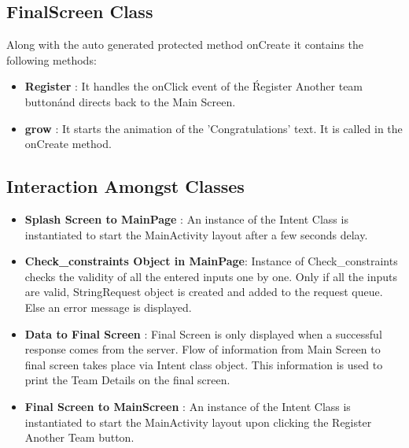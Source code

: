 \documentclass{article}
\begin{document}
\subsection{FinalScreen Class}
\par\noindent Along with the auto generated protected method onCreate it contains the following methods:
\begin{itemize}
\item\textbf{Register} : It handles the onClick event of the \'Register Another team button\' and directs back to the Main Screen.
\item\textbf{grow} : It starts the animation of the 'Congratulations' text. It is called in the onCreate method.
\end{itemize}
\subsection{Interaction Amongst Classes}

\begin{itemize}
\item \textbf{Splash Screen to MainPage} : An instance of the Intent Class is instantiated to start the MainActivity layout after a few seconds delay.
\item \textbf{Check\_constraints Object in MainPage}: Instance of Check\_constraints checks the validity of all the entered inputs one by one. Only if all the inputs are valid, StringRequest object is created and added to the request queue. Else an error message is displayed.
\item\textbf{Data to Final Screen} : Final Screen is only displayed when a successful response comes from the server. Flow of information from Main Screen to final screen takes place via Intent class object. This information is used to print the Team Details on the final screen.
\item\textbf{Final Screen to MainScreen} : An instance of the Intent Class is instantiated to start the MainActivity layout upon clicking the Register Another Team button.
\end{itemize}

\end{document}
